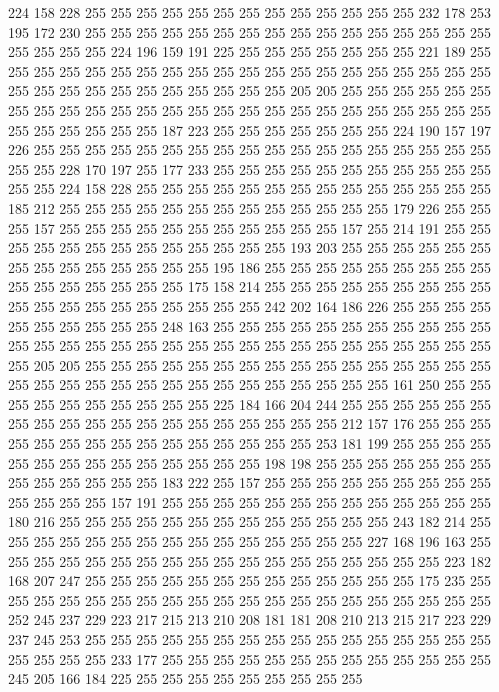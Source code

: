224 158 228 255 255 255 255 255 255 255 255 255 255 255 255 255 232 178 253 195
172 230 255 255 255 255 255 255 255 255 255 255 255 255 255 255 255 255 255 255
255 255 224 196 159 191 225 255 255 255 255 255 255 255 221 189 255 255 255 255
255 255 255 255 255 255 255 255 255 255 255 255 255 255 255 255 255 255 255 255
255 255 255 255 255 255 255 205 205 255 255 255 255 255 255 255 255 255 255 255
255 255 255 255 255 255 255 255 255 255 255 255 255 255 255 255 255 255 255 255
187 223 255 255 255 255 255 255 255 224 190 157 197 226 255 255 255 255 255 255
255 255 255 255 255 255 255 255 255 255 255 255 255 255 228 170 197 255 177 233
255 255 255 255 255 255 255 255 255 255 255 255 255 224 158 228 255 255 255 255
255 255 255 255 255 255 255 255 255 255 185 212 255 255 255 255 255 255 255 255
255 255 255 255 255 179 226 255 255 255 157 255 255 255 255 255 255 255 255 255
255 255 157 255 214 191 255 255 255 255 255 255 255 255 255 255 255 255 255 193
203 255 255 255 255 255 255 255 255 255 255 255 255 255 255 195 186 255 255 255
255 255 255 255 255 255 255 255 255 255 255 255 255 175 158 214 255 255 255 255
255 255 255 255 255 255 255 255 255 255 255 255 255 255 255 242 202 164 186 226
255 255 255 255 255 255 255 255 255 255 248 163 255 255 255 255 255 255 255 255
255 255 255 255 255 255 255 255 255 255 255 255 255 255 255 255 255 255 255 255
255 255 255 205 205 255 255 255 255 255 255 255 255 255 255 255 255 255 255 255
255 255 255 255 255 255 255 255 255 255 255 255 255 255 255 255 161 250 255 255
255 255 255 255 255 255 255 255 225 184 166 204 244 255 255 255 255 255 255 255
255 255 255 255 255 255 255 255 255 255 255 255 212 157 176 255 255 255 255 255
255 255 255 255 255 255 255 255 255 255 253 181 199 255 255 255 255 255 255 255
255 255 255 255 255 255 255 198 198 255 255 255 255 255 255 255 255 255 255 255
255 255 183 222 255 157 255 255 255 255 255 255 255 255 255 255 255 255 255 157
191 255 255 255 255 255 255 255 255 255 255 255 255 255 180 216 255 255 255 255
255 255 255 255 255 255 255 255 255 243 182 214 255 255 255 255 255 255 255 255
255 255 255 255 255 255 255 227 168 196 163 255 255 255 255 255 255 255 255 255
255 255 255 255 255 255 255 255 255 223 182 168 207 247 255 255 255 255 255 255
255 255 255 255 255 255 255 175 235 255 255 255 255 255 255 255 255 255 255 255
255 255 255 255 255 255 255 255 255 252 245 237 229 223 217 215 213 210 208 181
181 208 210 213 215 217 223 229 237 245 253 255 255 255 255 255 255 255 255 255
255 255 255 255 255 255 255 255 255 255 255 233 177 255 255 255 255 255 255 255
255 255 255 255 255 255 245 205 166 184 225 255 255 255 255 255 255 255 255 255
